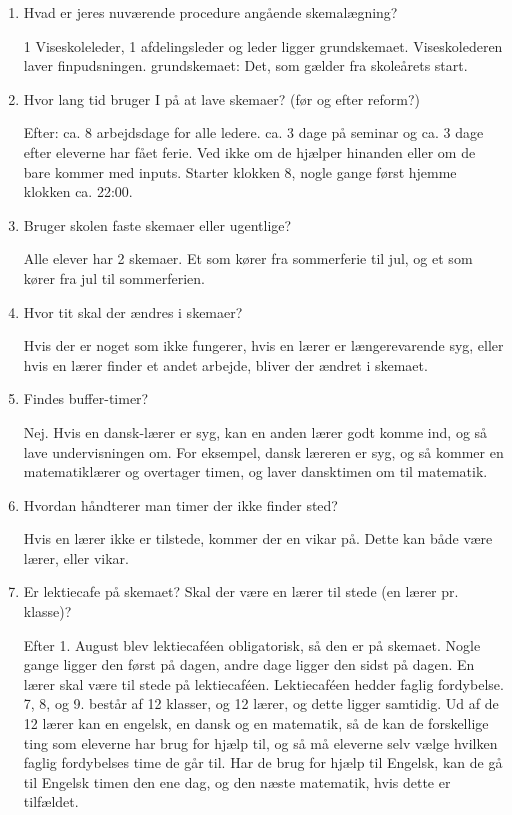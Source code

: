 \begin{enumerate}
	\item Hvad er jeres nuværende procedure angående skemalægning?
	
	1 Viseskoleleder, 1 afdelingsleder og leder ligger grundskemaet. Viseskolederen laver finpudsningen.
	grundskemaet: Det, som gælder fra skoleårets start.
	\item Hvor lang tid bruger I på at lave skemaer? (før og efter reform?)
	
	Efter: ca. 8 arbejdsdage for alle ledere. ca. 3 dage på seminar og ca. 3 dage efter eleverne har fået ferie. Ved ikke om de hjælper hinanden eller om de bare kommer med inputs. Starter klokken 8, nogle gange først hjemme klokken ca. 22:00.
	\item Bruger skolen faste skemaer eller ugentlige?
	
	Alle elever har 2 skemaer. Et som kører fra sommerferie til jul, og et som kører fra jul til sommerferien.
	\item Hvor tit skal der ændres i skemaer?
	
	Hvis der er noget som ikke fungerer, hvis en lærer er længerevarende syg, eller hvis en lærer finder et andet arbejde, bliver der ændret i skemaet.
	\item Findes buffer-timer? 
	
	Nej. Hvis en dansk-lærer er syg, kan en anden lærer godt komme ind, og så lave undervisningen om. For eksempel, dansk læreren er syg, og så kommer en matematiklærer og overtager timen, og laver dansktimen om til matematik.
	\item Hvordan håndterer man timer der ikke finder sted?
	
	Hvis en lærer ikke er tilstede, kommer der en vikar på. Dette kan både være lærer, eller vikar.
	\item Er lektiecafe på skemaet? Skal der være en lærer til stede (en lærer pr. klasse)?
	
	Efter 1. August blev lektiecaf\'een obligatorisk, så den er på skemaet. Nogle gange ligger den først på dagen, andre dage ligger den sidst på dagen.
	En lærer skal være til stede på lektiecaféen. Lektiecaféen hedder faglig fordybelse. 7, 8, og 9. består af 12 klasser, og 12 lærer, og dette ligger samtidig. Ud af de 12 lærer kan en engelsk, en dansk og en matematik, så de kan de forskellige ting som eleverne har brug for hjælp til, og så må eleverne selv vælge hvilken faglig fordybelses time de går til. Har de brug for hjælp til Engelsk, kan de gå til Engelsk timen den ene dag, og den næste matematik, hvis dette er tilfældet.
	

\end{enumerate}
